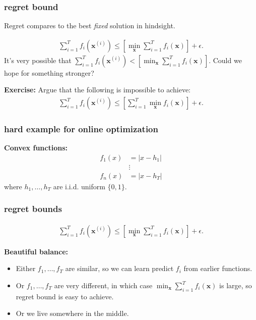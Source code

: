 \documentclass[compress]{beamer}
\newcommand{\bv}[1]{\mathbf{#1}}
\begin{document}
\begin{frame}[t]
	\frametitle{regret bound}
	\begin{center}
		Regret compares to the best \emph{fixed} solution in hindsight.
	\end{center}
	\begin{align*}
		\sum_{i=1}^T f_i(\bv{x}^{(i)}) \leq \left[\min_\bv{x} \sum_{i=1}^T f_i(\bv{x})\right] + \epsilon.
	\end{align*}
	It's very possible that $\sum_{i=1}^T f_i(\bv{x}^{(i)}) < \left[\min_\bv{x} \sum_{i=1}^T f_i(\bv{x})\right]$. Could we hope for something stronger?
	
	\textbf{Exercise:} Argue that the following is impossible to achieve:
	\begin{align*}
		\sum_{i=1}^T f_i(\bv{x}^{(i)}) \leq \left[\sum_{i=1}^T \min_\bv{x} f_i(\bv{x})\right] + \epsilon.
	\end{align*}
\end{frame}

\begin{frame}[t]
	\frametitle{hard example for online optimization}
	\textbf{Convex functions:}
	\begin{align*}
		f_1(x) &= |x - h_1|\\
		 &\vdots\\
		 f_n(x) &= |x - h_T|
	\end{align*}
where $h_1, \ldots, h_T$ are i.i.d. uniform $\{0,1\}$.
\end{frame}

\begin{frame}[t]
	\frametitle{regret bounds}
	\begin{align*}
		\sum_{i=1}^T f_i(\bv{x}^{(i)}) \leq \left[\min_\bv{x} \sum_{i=1}^T f_i(\bv{x})\right] + \epsilon.
	\end{align*}
	
	\textbf{Beautiful balance:}
	\begin{itemize}
		\item Either $f_1, \ldots, f_T$ are similar, so we can learn predict $f_i$ from earlier functions.
		\item Or $f_1, \ldots, f_T$  are very different, in which case $\min_\bv{x} \sum_{i=1}^T f_i(\bv{x})$ is large, so regret bound is easy to achieve. 
		\item Or we live somewhere in the middle.
	\end{itemize} 
\end{frame}
\end{document}
